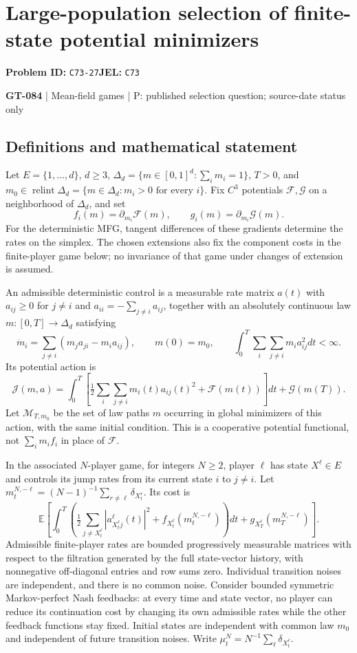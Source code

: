 \documentclass[11pt,a4paper]{article}
\begin{document}
\section*{Large-population selection of finite-state potential minimizers}
\textbf{Problem ID:} \texttt{C73-27}\quad \textbf{JEL:} \texttt{C73}\par
\label{problem:OP-0214}
\label{game:GT-084}
{\sffamily\small\color{muted}
{\small\textbf{GT-084} | Mean-field games | P: published selection question; source-date status only\par}
\par}
\subsection*{Definitions and mathematical statement}
Let $E=\{1,\ldots,d\}$, $d\geq3$, $\Delta_d=\{m\in[0,1]^d:\sum_i m_i=1\}$, $T>0$, and $m_0\in\operatorname{relint}\Delta_d=\{m\in\Delta_d:m_i>0\text{ for every }i\}$. Fix $C^3$ potentials $\mathcal F,\mathcal G$ on a neighborhood of $\Delta_d$, and set
\[
 f_i(m)=\partial_{m_i}\mathcal F(m),\qquad
 g_i(m)=\partial_{m_i}\mathcal G(m).
\]
For the deterministic MFG, tangent differences of these gradients determine the rates on the simplex. The chosen extensions also fix the component costs in the finite-player game below; no invariance of that game under changes of extension is assumed.

An admissible deterministic control is a measurable rate matrix $a(t)$ with $a_{ij}\geq0$ for $j\ne i$ and $a_{ii}=-\sum_{j\ne i}a_{ij}$, together with an absolutely continuous law $m:[0,T]\to\Delta_d$ satisfying
\[
 \dot m_i=\sum_{j\ne i}(m_j a_{ji}-m_i a_{ij}),\qquad m(0)=m_0,
 \qquad
 \int_0^T\sum_{i}\sum_{j\ne i}m_i a_{ij}^2dt<\infty.
\]
Its potential action is
\[
 \mathcal J(m,a)=\int_0^T\left[
 \tfrac12\sum_i\sum_{j\ne i}m_i(t)a_{ij}(t)^2+\mathcal F(m(t))\right]dt
 +\mathcal G(m(T)).
\]
Let $\mathcal M_{T,m_0}$ be the set of law paths $m$ occurring in global minimizers of this action, with the same initial condition. This is a cooperative potential functional, not $\sum_i m_if_i$ in place of $\mathcal F$.

In the associated $N$-player game, for integers $N\geq2$, player $\ell$ has state $X^\ell\in E$ and controls its jump rates from its current state $i$ to $j\ne i$. Let $m_t^{N,-\ell}=(N-1)^{-1}\sum_{r\ne\ell}\delta_{X_t^r}$. Its cost is
\[
 \mathbb E\!\left[\int_0^T\left(
 \tfrac12\sum_{j\ne X_t^\ell}|a_{X_t^\ell j}^{\ell}(t)|^2
 +f_{X_t^\ell}(m_t^{N,-\ell})\right)dt
 +g_{X_T^\ell}(m_T^{N,-\ell})\right].
\]
Admissible finite-player rates are bounded progressively measurable matrices with respect to the filtration generated by the full state-vector history, with nonnegative off-diagonal entries and row sums zero. Individual transition noises are independent, and there is no common noise. Consider bounded symmetric Markov-perfect Nash feedbacks: at every time and state vector, no player can reduce its continuation cost by changing its own admissible rates while the other feedback functions stay fixed. Initial states are independent with common law $m_0$ and independent of future transition noises. Write $\mu_t^N=N^{-1}\sum_\ell\delta_{X_t^\ell}$.
\end{document}
